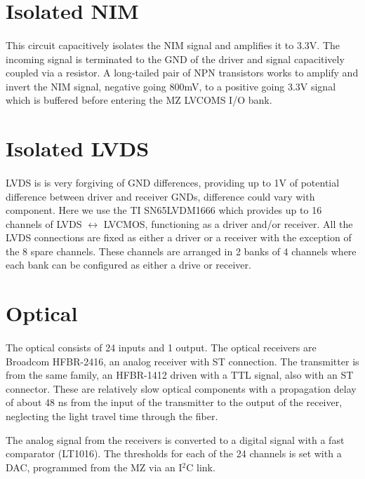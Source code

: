 \documentclass{report}
\begin{document}
\section{Isolated NIM}
\paragraph{}
This circuit capacitively isolates the NIM signal and amplifies it to 3.3V. The incoming signal is 
terminated to the GND of the driver and signal capacitively coupled via a resistor. A long-tailed pair 
of NPN transistors works to amplify and invert the NIM signal, negative going 800mV, to a positive 
going 3.3V signal which is buffered before entering the MZ LVCOMS I/O bank.

\section{Isolated LVDS}
\paragraph{}
LVDS is is very forgiving of GND differences, providing up to 1V of potential difference between driver
 and receiver GNDs, difference could vary with component. Here we use the TI SN65LVDM1666 
 which provides up to 16 channels of LVDS $\leftrightarrow$ LVCMOS, functioning as a driver and/or
  receiver. All the LVDS connections are fixed as either a driver or a receiver with the exception of the
   8 spare channels. These channels are arranged in 2 banks of 4 channels where each bank can be
    configured as either a drive or receiver. 

\section{Optical}
\paragraph{}
The optical consists of 24 inputs and 1 output. The optical receivers are Broadcom HFBR-2416, an
 analog receiver with ST connection. The transmitter is from the same family, an HFBR-1412 driven
  with a TTL signal, also with an ST connector. These are relatively slow optical components with a
   propagation delay of about 48 ns from the input of the transmitter to the output of the receiver,
    neglecting the light travel time through the fiber. 

The analog signal from the receivers is converted to a digital signal with a fast comparator (LT1016). 
The thresholds for each of the 24 channels is set with a DAC, programmed from the MZ via an I$^2$C 
link.
\end{document}
